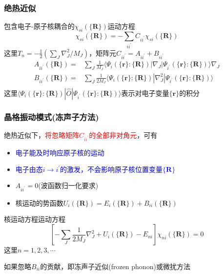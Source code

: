 \documentclass[cjk,slidestop,compress,mathserif,blue]{beamer}
\begin{document}
\frame
{
	\frametitle{绝热近似}
	包含电子-原子核耦合的$\chi_{si}(\{\mathbf{R}\})$运动方程
	\begin{displaymath}
		[T_N+E_i(\{\mathbf{R}\})-E_s]\chi_{si}(\{\mathbf{R}\})=-\sum_{ii^{\prime}}C_{ii^{\prime}}\chi_{si}(\{\mathbf{R}\})
	\end{displaymath}
	这里$T_n=-\frac12(\sum\limits_J\nabla_J^2/M_J)$，矩阵元$C_{ii^{\prime}}=A_{ii^{\prime}}+B_{ii^{\prime}}$
	\begin{displaymath}
		\begin{aligned}
			A_{ii^{\prime}}(\{\mathbf{R}\})=&\sum_J\frac1{M_J}\langle\Psi_i(\{\mathbf{r}\}:\{\mathbf{R}\})|\nabla_J|\Psi_{i^{\prime}}(\{\mathbf{r}\}:\{\mathbf{R}\})\rangle\nabla_J\\
			B_{ii^{\prime}}(\{\mathbf{R}\})=&\sum_J\frac1{2M_J}\langle\Psi_i(\{\mathbf{r}\}:\{\mathbf{R}\})|\nabla_J^2|\Psi_{i^{\prime}}(\{\mathbf{r}\}:\{\mathbf{R}\})\rangle\\
		\end{aligned}
	\end{displaymath}
	这里$\langle\Psi_i(\{\mathbf{r}\}:\{\mathbf{R}\})|\hat O|\Psi_{i^{\prime}}(\{\mathbf{r}\}:\{\mathbf{R}\})\rangle$表示对电子变量$\{\mathbf{r}\}$的积分
}

\frame
{
	\frametitle{晶格振动模式(冻声子方法)}
	绝热近似下，\textcolor{red}{将忽略矩阵$C_{ii^{\prime}}$的全部非对角元}，可有
	\begin{itemize}
		\item \textcolor{blue}{电子能及时响应原子核的运动}
		\item \textcolor{blue}{电子由态$i\rightarrow i^{\prime}$的激发，不会影响原子核位置变量${\{\mathbf{R}\}}$}
		\item $A_{ii^{\prime}}=0$(波函数归一化要求)
		\item 核运动的势函数$U_i(\{\mathbf{R}\})=E_i(\{\mathbf{R}\})+B_{ii}(\{\mathbf{R}\})$
	\end{itemize}
	核运动方程运动方程
	\begin{displaymath}
		\left[ -\sum_J\frac1{2M_J}\nabla_J^2+U_i(\{\mathbf{R}\})-E_{ni} \right]\chi_{ni}(\{\mathbf{R}\})=0
	\end{displaymath}
这里$n=1,2,3,\cdots$

如果忽略$B_{ii}$的贡献，即冻声子近似(\textrm{frozen phonon})或微扰方法
}
\end{document}
